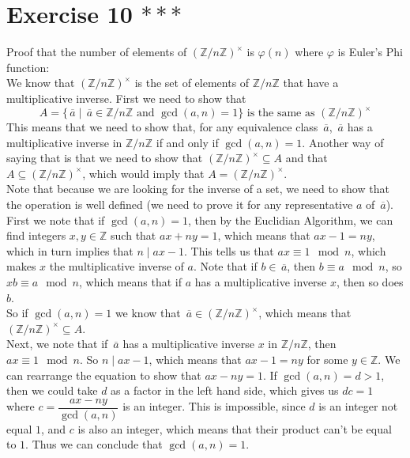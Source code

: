 \documentclass[12pt]{article}
\newcommand{\Z}{\mathbb{Z}}
\newcommand{\olsi}[1]{\,\overline{{#1}}}
\begin{document}
    \section*{Exercise 10 $***$}
    Proof that the number of elements of $(\Z/n\Z)^\times$
    is $\varphi(n)$ where $\varphi$ is Euler's Phi function: \\
    We know that $(\Z/n\Z)^\times$ is the set of elements of $\Z/n\Z$
    that have a multiplicative inverse.
    First we need to show that 
    \[ A = \{ \olsi{a} \mid \olsi{a} \in \Z/n\Z
    \text{ and } \gcd(a, n) = 1 \} 
    \text{ is the same as } (\Z/n\Z)^\times \]
    This means that we need to show that,
    for any equivalence class $\olsi{a}$,
    $\olsi{a}$ has a multiplicative inverse in $\Z/n\Z$
    if and only if $\gcd(a, n) = 1$.
    Another way of saying that is that we need to show
    that $(\Z/n\Z)^\times \subseteq A$
    and that $A \subseteq (\Z/n\Z)^\times$,
    which would imply that $A = (\Z/n\Z)^\times$. \\
    Note that because we are looking for the inverse of a set,
    we need to show that the operation is well defined
    (we need to prove it for any representative $a$ of $\olsi{a}$). \\
    First we note that if $\gcd(a, n) = 1$,
    then by the Euclidian Algorithm, we can find integers $x, y \in \Z$
    such that $ax + ny = 1$,
    which means that $ax - 1 = ny$,
    which in turn implies that $n \mid ax - 1$.
    This tells us that $ax \equiv 1 \mod n$,
    which makes $x$ the multiplicative inverse of $a$.
    Note that if $b \in \olsi{a}$,
    then $b \equiv a \mod n$,
    so $xb \equiv a \mod n$,
    which means that if $a$ has a multiplicative inverse $x$,
    then so does $b$. \\
    So if $\gcd(a, n) = 1$
    we know that $\olsi{a} \in (\Z/n\Z)^\times$,
    which means that $(\Z/n\Z)^\times \subseteq A$. \\
    Next, we note that if $\olsi{a}$ has a multiplicative inverse
    $x$ in $\Z/n\Z$,
    then $ax \equiv 1 \mod n$.
    So $n \mid ax - 1$,
    which means that $ax - 1 = ny$ for some $y \in \Z$.
    We can rearrange the equation to show that $ax - ny = 1$.
    If $\gcd(a, n) = d > 1$,
    then we could take $d$ as a factor in the left hand side,
    which gives us $dc = 1$ where $c = \dfrac{ax - ny}{\gcd(a, n)}$
    is an integer.
    This is impossible,
    since $d$ is an integer not equal $1$,
    and $c$ is also an integer,
    which means that their product can't be equal to $1$.
    Thus we can conclude that $\gcd(a, n) = 1$.
\end{document}
